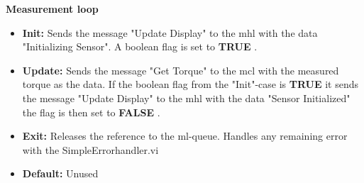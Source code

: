 \documentclass{ol-softwaremanual}
\newcommand{\true}{\textbf{TRUE} }
\newcommand{\false}{\textbf{FALSE} }
\begin{document}
\textbf{Measurement loop}
\begin{itemize}
    \item \textbf{Init:} Sends the message "Update Display" to the \acrshort{mhl} with the data "Initializing Sensor". A boolean flag is set to \true. 
    \item \textbf{Update:} Sends the message "Get Torque" to the \acrshort{mcl} with the measured torque as the data. If the boolean flag from the "Init"-case is \true it sends the message "Update Display" to the \acrshort{mhl} with the data "Sensor Initialized" the flag is then set to \false. 
    \item \textbf{Exit:}  Releases the reference to the \acrshort{ml}-queue. Handles any remaining error with the SimpleErrorhandler.vi
    \item \textbf{Default:} Unused
\end{itemize}
\end{document}
